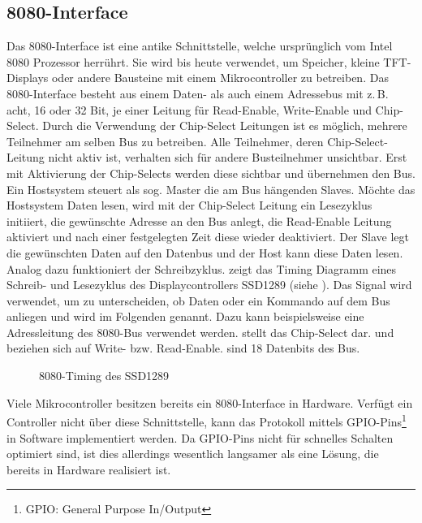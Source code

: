 \subsection{8080-Interface}
Das 8080-Interface ist eine antike Schnittstelle, welche ursprünglich vom Intel 8080 Prozessor herrührt. Sie wird bis heute verwendet, um Speicher, kleine TFT-Displays oder andere Bausteine mit einem Mikrocontroller zu betreiben. Das 8080-Interface besteht aus einem Daten- als auch einem Adressebus mit z.\,B. acht, 16 oder 32 Bit, je einer Leitung für Read-Enable, Write-Enable und Chip-Select. Durch die Verwendung der Chip-Select Leitungen ist es möglich, mehrere Teilnehmer am selben Bus zu betreiben. Alle Teilnehmer, deren Chip-Select-Leitung nicht aktiv ist, verhalten sich für andere Busteilnehmer unsichtbar. Erst mit Aktivierung der Chip-Selects werden diese sichtbar und übernehmen den Bus. Ein Hostsystem steuert als sog. Master die am Bus hängenden Slaves. Möchte das Hostsystem Daten lesen, wird mit der Chip-Select Leitung ein Lesezyklus initiiert, die gewünschte Adresse an den Bus anlegt, die Read-Enable Leitung aktiviert und nach einer festgelegten Zeit diese wieder deaktiviert. Der Slave legt die gewünschten Daten auf den Datenbus und der Host kann diese Daten lesen. Analog dazu funktioniert der Schreibzyklus. 
 zeigt das Timing Diagramm eines Schreib- und Lesezyklus des Displaycontrollers SSD1289 (siehe \cite{SSD2007}). Das Signal  wird verwendet, um zu unterscheiden, ob Daten oder ein Kommando auf dem Bus anliegen und wird im Folgenden  genannt. Dazu kann beispielsweise eine Adressleitung des 8080-Bus verwendet werden.  stellt das Chip-Select dar.  und  beziehen sich auf Write- bzw. Read-Enable.  sind 18 Datenbits des Bus. 

\begin{figure}[htp]
	\centering
{}
	\caption{8080-Timing des SSD1289}
	\label{fig:8080_timing}
\end{figure}
Viele Mikrocontroller besitzen bereits ein 8080-Interface in Hardware. Verfügt ein Controller nicht über diese Schnittstelle, kann das Protokoll mittels GPIO-Pins\footnote{GPIO: General Purpose In/Output} in Software implementiert werden. 
Da GPIO-Pins nicht für schnelles Schalten optimiert sind, ist dies allerdings wesentlich langsamer als eine Lösung, die bereits in Hardware realisiert ist.

